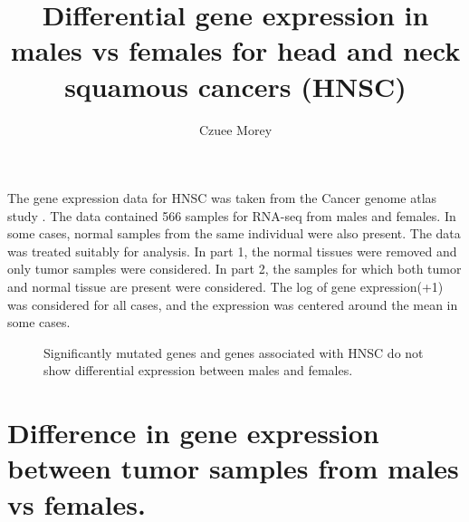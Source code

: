 \documentclass[11pt]{article} %
\title{Differential gene expression in males vs females for head and neck squamous cancers (HNSC)}
\author{Czuee Morey}
\begin{document}
\maketitle

The gene expression data for HNSC was taken from the Cancer genome atlas study \cite{nature}. The data contained 566 samples for RNA-seq from males and females. In some cases, normal samples from the same individual were also present. The data was treated suitably for analysis. In part 1, the normal tissues were removed and only tumor samples were considered. In part 2, the samples for which both tumor and normal tissue are present were considered. The log of gene expression(+1) was considered for all cases, and the expression was centered around the mean in some cases.

\begin{figure}[htbp]
\centering
{}
\caption{Significantly mutated genes \cite{nature} and genes associated with HNSC \cite{pone} do not show differential expression between males and females.}
\label{mutsig}
\end{figure}

\section{Difference in gene expression between tumor samples from males vs females. }
\end{document}
